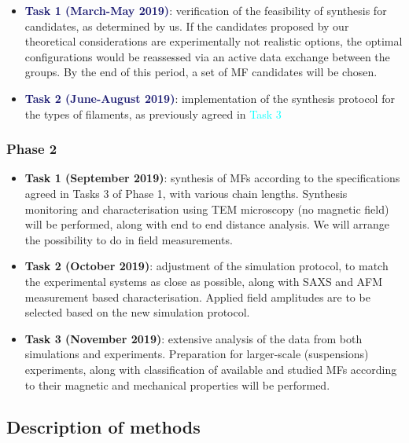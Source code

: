 \documentclass{article}
\begin{document}
\begin{itemize}
    \item{\textbf{\textcolor{MidnightBlue}{Task 1 (March-May 2019)}}: verification of the feasibility of synthesis for candidates, as determined by us. If the candidates proposed by our theoretical considerations are experimentally not realistic options, the optimal configurations would be reassessed via an active data exchange between the groups. By the end of this period, a set of MF candidates will be chosen.}
    \item{\textbf{\textcolor{MidnightBlue}{Task 2 (June-August 2019)}}:  implementation of the synthesis protocol for the types of filaments, as previously agreed in \textcolor{cyan}{Task 3}}
\end{itemize}
\subsubsection{Phase 2}
\begin{itemize}
    \item{\textbf{\textcolor{PineGreen}{Task 1 (September 2019)}}: synthesis of MFs according to the specifications agreed in Tasks 3 of Phase 1, with various chain lengths. Synthesis monitoring and characterisation using TEM microscopy (no magnetic field) will be performed, along with end to end distance analysis. We will arrange the possibility to do in field measurements. }
    \item{\textbf{\textcolor{PineGreen}{Task 2 (October 2019)}}: adjustment of the simulation protocol, to match the experimental systems as close as possible, along with SAXS and AFM measurement based characterisation. Applied field amplitudes are to be selected based on the new simulation protocol.}
    \item{\textbf{\textcolor{PineGreen}{Task 3 (November 2019)}}: extensive analysis of the data from both simulations and experiments. Preparation for larger-scale (suspensions) experiments, along with classification of available and studied MFs according to their magnetic and mechanical properties will be performed.}
\end{itemize}
\subsection{Description of methods}
\end{document}

